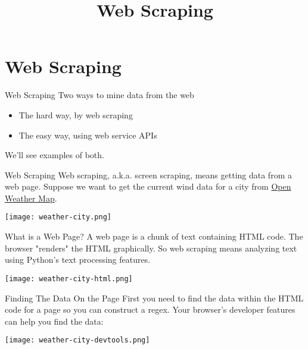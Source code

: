 \documentclass[smaller]{beamer}
\author{}
\date{}
\title{Web Scraping}
\begin{document}
\maketitle

\section{Web Scraping}
\label{sec-1}

\begin{frame}[label=sec-1-1]{Web Scraping}
Two ways to mine data from the web

\begin{itemize}
\item The hard way, by web scraping
\item The easy way, using web service APIs
\end{itemize}

We’ll see examples of both.
\end{frame}

\begin{frame}[label=sec-1-2]{Web Scraping}
Web scraping, a.k.a. screen scraping, means getting data from a web page. Suppose we want to get the current wind data for a city from \href{http://openweathermap.org/}{Open Weather Map}.

\texttt{[image: weather-city.png]}
\end{frame}

\begin{frame}[label=sec-1-3]{What is a Web Page?}
A web page is a chunk of text containing HTML code. The browser "renders" the HTML graphically. So web scraping means analyzing text using Python's text processing features.

\texttt{[image: weather-city-html.png]}
\end{frame}


\begin{frame}[label=sec-1-4]{Finding The Data On the Page}
First you need to find the data within the HTML code for a page so you can construct a regex. Your browser's developer features can help you find the data:

\texttt{[image: weather-city-devtools.png]}
\end{frame}
\end{document}
